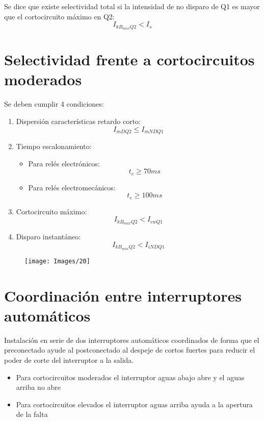 Se dice que existe selectividad total si la intensidad de no disparo de Q1 es mayor que el cortocircuito máximo en Q2:
\begin{equation}
	I_{kB_{max}Q2}< I_s
\end{equation}
\section{Selectividad frente a cortocircuitos moderados}
Se deben cumplir 4 condiciones:
\begin{enumerate}
	\item Dispersión características retardo corto:
	\begin{equation}
		I_{mDQ2}\le I_{mNDQ1}
	\end{equation}
	\item Tiempo escalonamiento: 
	\begin{itemize}
		\item Para relés electrónicos: 
		\begin{equation}
			t_e \ge 70 ms
		\end{equation}
		\item Para relés electromecánicos:
		\begin{equation}
			t_e \ge 100 ms
		\end{equation}
	\end{itemize}
	
	\item Cortocircuito máximo:
	\begin{equation}
		I_{kB_{max}Q2}< I_{cwQ1}
	\end{equation}
	\item Disparo instantáneo:
	\begin{equation}
		I_{kB_{min}Q2}< I_{iNDQ1} 
	\end{equation}
\end{enumerate}
\begin{figure}[H]
	\centering
	\texttt{[image: Images/20]}
\end{figure}

\section{Coordinación entre interruptores automáticos}
Instalación en serie de dos interruptores automáticos coordinados de forma que el preconectado ayude al postconectado al despeje de cortos fuertes para reducir el poder de corte del interruptor a la salida. 
\begin{itemize}
	\item Para cortocircuitos moderados el interruptor aguas abajo abre y el aguas arriba no abre
	\item Para cortocircuitos elevados el interruptor aguas arriba ayuda a la apertura de la falta
\end{itemize}

